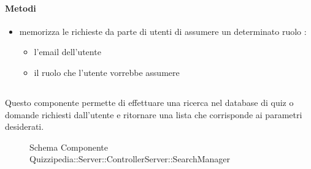 \paragraph{Metodi}
\begin{itemize}
\item {}
\newline
memorizza le richieste da parte di utenti di assumere un determinato ruolo
\newline
{} :
\begin{itemize}
\item {}
\newline
l'email dell'utente
\item {}
\newline
il ruolo che l'utente vorrebbe assumere
\end{itemize}
\end{itemize}
\subsection{}
Questo componente permette di effettuare una ricerca nel database di quiz o domande richiesti dall'utente e ritornare una lista che corrisponde ai parametri desiderati.
\begin{figure}[H]
\centering
\noindent{}
\caption[Schema Componente Quizzipedia::Server::ControllerServer::SearchManager]{Schema Componente Quizzipedia::Server::ControllerServer::SearchManager}
\end{figure}
